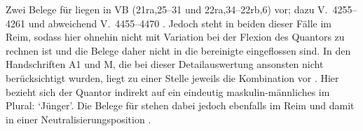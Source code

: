 \begin{exe}
\end{exe}

Zwei Belege für  liegen in VB (21ra,25--31 und
22ra,34--22rb,6) vor; dazu V.~4255--4261 und abweichend V.~4455--4470
\autocite[159, 163]{schroeder1895}. Jedoch steht  in beiden dieser
Fälle im Reim, sodass hier ohnehin nicht mit Variation bei der
Flexion des Quantors zu rechnen ist und die Belege daher nicht in die
bereinigte  eingeflossen sind. In den Handschriften A1 und M,
die bei dieser Detailauswertung ansonsten nicht berücksichtigt wurden, liegt zu
einer Stelle jeweils die Kombination  vor .
Hier bezieht sich der Quantor indirekt auf ein eindeutig maskulin-männliches
 im Plural:  `Jünger'. Die Belege für 
stehen dabei jedoch ebenfalls im Reim und damit in einer
Neutralisierungsposition
\autocites[vgl.][662--663]{grimm1870}[89]{askedal1973}.

